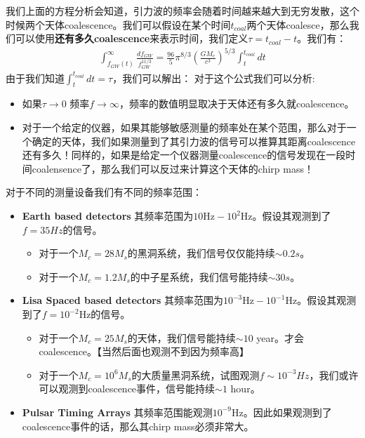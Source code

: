 我们上面的方程分析会知道，引力波的频率会随着时间越来越大到无穷发散，这个时候两个天体coalescence。我们可以假设在某个时间$
t_{coal} $两个天体coalesce，那么我们可以使用\textbf{还有多久coalescence}来表示时间，我们定义$
\tau = t_{coal} - t $。我们有：
\begin{align}
  \int_{f_{GW}(t)}^{\infty} \displaystyle\frac{df_{GW}}{f_{GW}^{11/3}}
  = \displaystyle\frac{96}{5} \pi^{8/3}
  \left(\displaystyle\frac{GM_c}{c^3}\right)^{5/3} \int_{t}^{t_{coal}} dt
\end{align}
由于我们知道$ \int_t^{t_{coal}} dt = \tau $，我们可以解出：
对于这个公式我们可以分析:
\begin{itemize}
  \item 如果$ \tau \to 0 $ 频率$ f \to \infty $，频率的数值明显取决于天体还有多久就coalescence。
  \item
    对于一个给定的仪器，如果其能够敏感测量的频率处在某个范围，那么对于一个确定的天体，我们如果测量到了其引力波的信号可以推算其距离coalescence还有多久！同样的，如果是给定一个仪器测量coalescence的信号发现在一段时间coalensence了，那么我们可以反过来计算这个天体的chirp
    mass！
\end{itemize}

\bigskip
{}

对于不同的测量设备我们有不同的频率范围：
\begin{itemize}
  \item \textbf{Earth based detectors} 其频率范围为$ 10 \mathrm{Hz} - 10^2
    \mathrm{Hz} $。假设其观测到了$ f = 35Hz $的信号。
    \begin{itemize}
      \item 对于一个$ M_c = 28 M_s $的黑洞系统，我们信号仅仅能持续$ \sim 0.2s $。
      \item 对于一个$ M_c = 1.2 M_s $的中子星系统，我们信号能持续$ \sim 30s $。
    \end{itemize}
  \item \textbf{Lisa Spaced based detectors} 其频率范围为$ 10^{-3}
    \mathrm{Hz} - 10^{-1} \mathrm{Hz} $。假设其观测到了$ f = 10^{-2} \mathrm{Hz} $的信号。
    \begin{itemize}
      \item 对于一个$ M_c = 25 M_s $的天体，我们信号能持续$ \sim 10 $
        year。才会coalescence。【当然后面也观测不到因为频率高】
      \item 对于一个$ M_c = 10^6 M_s $的大质量黑洞系统，试图观测$ f \sim 10^{-3} Hz
        $，我们或许可以观测到coalescence事件，信号能持续$ \sim 1 $ hour。
    \end{itemize}
  \item \textbf{Pulsar Timing Arrays} 其频率范围能观测$ 10^{-9} \mathrm{Hz}
    $。因此如果观测到了coalescence事件的话，那么其chirp mass必须非常大。
\end{itemize}

